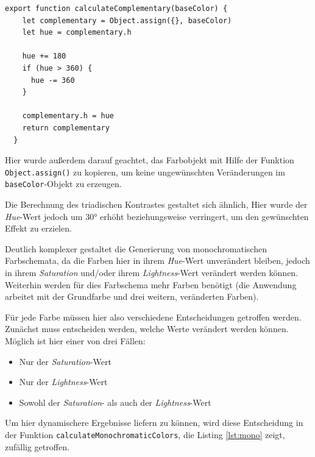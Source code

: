 \begin{lstlisting}[caption=Berechnung eines Komplementär-Kontrastes, label=lst:complementary]
  export function calculateComplementary(baseColor) {
    let complementary = Object.assign({}, baseColor)
    let hue = complementary.h

    hue += 180
    if (hue > 360) {
      hue -= 360
    }

    complementary.h = hue
    return complementary
  }
\end{lstlisting}

Hier wurde außerdem darauf geachtet, das Farbobjekt mit Hilfe der Funktion \verb|Object.assign()| zu kopieren, um keine ungewünschten Veränderungen im \verb|baseColor|-Objekt zu erzeugen\footnotemark{}.


Die Berechnung des triadischen Kontrastes gestaltet sich ähnlich, Hier wurde der \textit{Hue}-Wert jedoch um 30° erhöht beziehungsweise verringert, um den gewünschten Effekt zu erzielen.

Deutlich komplexer gestaltet die Generierung von monochromatischen Farbschemata, da die Farben hier in ihrem \textit{Hue}-Wert unverändert bleiben, jedoch in ihrem \textit{Saturation} und/oder ihrem \textit{Lightness}-Wert verändert werden können. Weiterhin werden für dies Farbschema mehr Farben benötigt (die Anwendung arbeitet mit der Grundfarbe und drei weitern, veränderten Farben).

Für jede Farbe müssen hier also verschiedene Entscheidungen getroffen werden. Zunächst muss entscheiden werden, welche Werte verändert werden können. Möglich ist hier einer von drei Fällen:

\begin{itemize}
  \item Nur der \textit{Saturation}-Wert
  \item Nur der \textit{Lightness}-Wert
  \item Sowohl der \textit{Saturation}- als auch der \textit{Lightness}-Wert
\end{itemize}

Um hier dynamischere Ergebnisse liefern zu können, wird diese Entscheidung in der Funktion \verb|calculateMonochromaticColors|, die Listing \ref{lst:mono} zeigt, zufällig getroffen.

